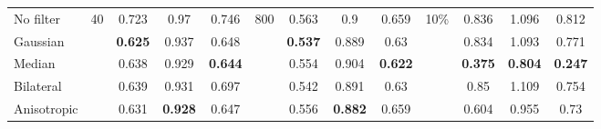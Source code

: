 \begin{table}[ht]
\begin{tabular}{rrrrrrrrrrrrr}
    
    \multicolumn{1}{l}{No filter} & \multirow{5}[1]{*}{40} & \multicolumn{1}{c}{0.723} & \multicolumn{1}{c}{0.97} & \multicolumn{1}{c}{0.746} & \multirow{5}[1]{*}{800} & \multicolumn{1}{c}{0.563} & \multicolumn{1}{c}{0.9} & \multicolumn{1}{c}{0.659} & \multirow{5}[1]{*}{10\%} & \multicolumn{1}{c}{0.836} & \multicolumn{1}{c}{1.096} & \multicolumn{1}{c}{0.812} \\
    \multicolumn{1}{l}{Gaussian} &       & \multicolumn{1}{c}{\textbf{0.625}} & \multicolumn{1}{c}{0.937} & \multicolumn{1}{c}{0.648} &       & \multicolumn{1}{c}{\textbf{0.537}} & \multicolumn{1}{c}{0.889} & \multicolumn{1}{c}{0.63} &       & \multicolumn{1}{c}{0.834} & \multicolumn{1}{c}{1.093} & \multicolumn{1}{c}{0.771} \\
    \multicolumn{1}{l}{Median} &       & \multicolumn{1}{c}{0.638} & \multicolumn{1}{c}{0.929} & \multicolumn{1}{c}{\textbf{0.644}} &       & \multicolumn{1}{c}{0.554} & \multicolumn{1}{c}{0.904} & \multicolumn{1}{c}{\textbf{0.622}} &       & \multicolumn{1}{c}{\textbf{0.375}} & \multicolumn{1}{c}{\textbf{0.804}} & \multicolumn{1}{c}{\textbf{0.247}} \\
    \multicolumn{1}{l}{Bilateral} &       & \multicolumn{1}{c}{0.639} & \multicolumn{1}{c}{0.931} & \multicolumn{1}{c}{0.697} &       & \multicolumn{1}{c}{0.542} & \multicolumn{1}{c}{0.891} & \multicolumn{1}{c}{0.63} &       & \multicolumn{1}{c}{0.85} & \multicolumn{1}{c}{1.109} & \multicolumn{1}{c}{0.754} \\
    \multicolumn{1}{l}{Anisotropic} &       & \multicolumn{1}{c}{0.631} & \multicolumn{1}{c}{\textbf{0.928}} & \multicolumn{1}{c}{0.647} &       & \multicolumn{1}{c}{0.556} & \multicolumn{1}{c}{\textbf{0.882}} & \multicolumn{1}{c}{0.659} &       & \multicolumn{1}{c}{0.604} & \multicolumn{1}{c}{0.955} & \multicolumn{1}{c}{0.73} \\
    \bottomrule
    \end{tabular}%
  \label{tab:exp_filter_noise}%
\end{table}%





